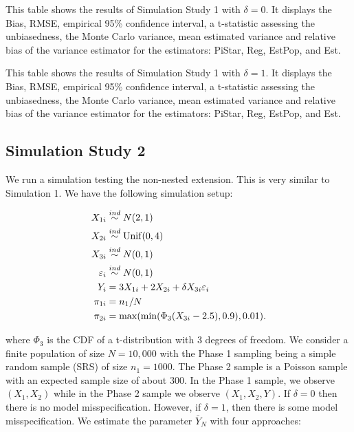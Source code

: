 \documentclass[12pt]{article}
\begin{document}
\begin{table}[ht!]
  \centering
  
\caption{This table shows the results of Simulation Study 1 with $\delta = 0$.
  It displays the Bias, RMSE, empirical 95\% confidence interval, a t-statistic
  assessing the unbiasedness, the Monte Carlo variance, mean estimated variance
  and relative bias of the variance estimator for the estimators: PiStar, Reg,
  EstPop, and Est.}
\label{tab:tpdc0-mean}
\end{table}

\begin{table}[ht!]
  \centering
  
\caption{This table shows the results of Simulation Study 1 with $\delta = 1$.
  It displays the Bias, RMSE, empirical 95\% confidence interval, a t-statistic
  assessing the unbiasedness, the Monte Carlo variance, mean estimated variance
  and relative bias of the variance estimator for the estimators: PiStar, Reg,
  EstPop, and Est.}
\label{tab:tpdc1-mean}
\end{table}

\subsection{Simulation Study 2}

We run a simulation testing the non-nested extension. This is very similar to
Simulation 1. We have the following simulation setup:

$$
\begin{aligned}
X_{1i} &\stackrel{ind}{\sim} N(2, 1) \\
X_{2i} &\stackrel{ind}{\sim} \rm{Unif}(0, 4) \\
X_{3i} &\stackrel{ind}{\sim} N(0, 1) \\
\varepsilon_i &\stackrel{ind}{\sim} N(0, 1) \\
Y_{i} &= 3 X_{1i} + 2 X_{2i} + \delta X_{3i} \varepsilon_i \\
\pi_{1i} &= n_1 / N \\
\pi_{2i} &= \max(\min(\Phi_3(X_{3i} - 2.5), 0.9), 0.01).
\end{aligned}
$$

where $\Phi_3$ is the CDF of a t-distribution with 3 degrees of freedom.
We consider a finite population of size $N = 10,000$ with the Phase 1 
sampling being a simple random sample (SRS) of size $n_1 = 1000$. The Phase 2
sample is a Poisson sample with an expected sample size of about 300.
In the Phase 1 sample, we observe 
$(X_1, X_2)$ while in the Phase 2 sample we observe $(X_1, X_2, Y)$. 
If $\delta = 0$ then there is no model misspecification. However, if $\delta =
1$, then there is some model misspecification. We estimate
the parameter $\bar Y_N$ with four approaches:
\end{document}
